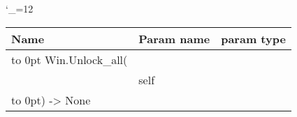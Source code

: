 \begingroup \catcode`\_=12 \tt
\begin{tabular}{lll}
\toprule
\textrm{Name}&\textrm{Param name}&\textrm{param type}\\
\midrule
\hbox to 0pt {Win.Unlock_all(\hss}\\
& self\\
\hbox to 0pt{) -> None\hss}\\
\bottomrule
\end{tabular}
\endgroup
